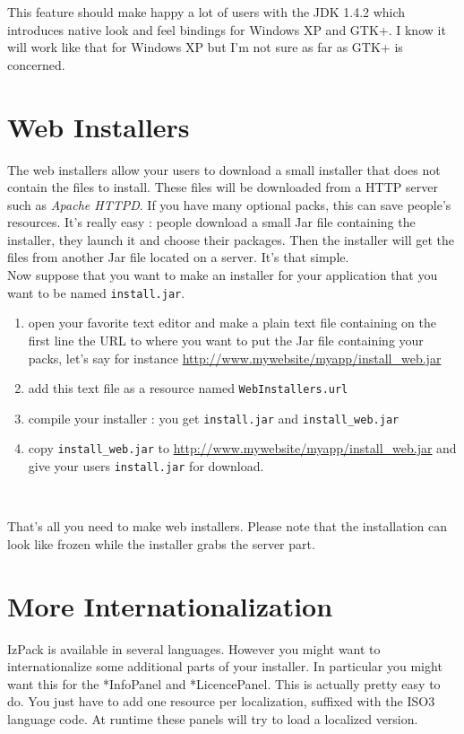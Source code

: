This feature should make happy a lot of users with the JDK 1.4.2 which
introduces native look and feel bindings for Windows XP and GTK+. I know it will
work like that for Windows XP but I'm not sure as far as GTK+ is concerned.\\

\section{Web Installers}

The web installers allow your users to download a small installer that does not
contain the files to install. These files will be downloaded from a HTTP server
such as \textit{Apache HTTPD}. If you have many optional packs, this can save
people's resources. It's really easy : people download a small Jar
file containing the installer, they launch it and choose their
packages. Then the installer will get the files from another Jar file
located on a server. It's that simple.\\

Now suppose that you want to make an installer for your application
that you want to be named \texttt{install.jar}.
\begin{enumerate}
  \item open your favorite text editor and make a plain text file
  containing on the first line the URL to where you want to put the
  Jar file containing your packs, let's say for instance
  \url{http://www.mywebsite/myapp/install_web.jar}
  \item add this text file as a resource named
  \texttt{WebInstallers.url}
  \item compile your installer : you get \texttt{install.jar} and
  \texttt{install\_web.jar}
  \item copy \texttt{install\_web.jar} to
  \url{http://www.mywebsite/myapp/install_web.jar} and give your
  users \texttt{install.jar} for download.
\end{enumerate}\

That's all you need to make web installers.
Please note that the installation can look like frozen while the installer
grabs the server part.\\

\section{More Internationalization}

IzPack is available in several languages. However you might want to
internationalize some additional parts of your installer. In particular you
might want this for the *InfoPanel and *LicencePanel. This is actually pretty
easy to do. You just have to add one resource per localization, suffixed with the
ISO3 language code. At runtime these panels will try to load a localized version.\\

